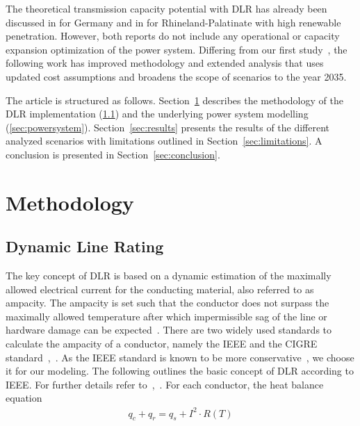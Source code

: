 \documentclass[preprint,12pt]{elsarticle}
\begin{document}
The theoretical transmission capacity potential with DLR has already been discussed in \cite{samweberProjektMeritOrder2016} for Germany and in \cite{energynauticsgmbhoko-insitute.v.bird&birdDistributionSystemStudy2016} for Rhineland-Palatinate with high renewable penetration. However, both reports do not include any operational or capacity expansion optimization of the power system.
Differing from our first study~\cite{glaumEnhancingGermanTransmission2022}, the following work has improved methodology and extended analysis that uses updated cost assumptions and broadens the scope of scenarios to the year 2035.

The article is structured as follows.
Section~\ref{sec:methodology} describes the methodology of the DLR implementation (\ref{sec:dlr}) and the underlying power system modelling (\ref{sec:powersystem}). Section~\ref{sec:results} presents the results of the different analyzed scenarios with  limitations outlined in Section~\ref{sec:limitations}. A conclusion is presented in Section~\ref{sec:conclusion}.


\section{Methodology}
\label{sec:methodology}

\subsection{Dynamic Line Rating}
\label{sec:dlr}

The key concept of DLR is based on a dynamic estimation of the maximally allowed electrical current for the conducting material, also referred to as ampacity.
The ampacity is set such that the conductor does not surpass the maximally allowed temperature  after which impermissible sag of the line or hardware damage can be expected~\cite{KARIMI2018600}.
There are two widely used standards to calculate the ampacity of a conductor, namely the IEEE and the CIGRE standard~\cite{ieeeIEEEStd738},~\cite{iglesiasGUIDETHERMALRATING2014}. As the IEEE standard is known to be  more conservative~\cite{simmsComparativeAnalysisDynamic2013}, we choose it for our modeling.
The following outlines the basic concept of DLR according to IEEE. For further details refer to~\cite{ieeeIEEEStandardCalculating2012},~\cite{ieeeIEEEStd738}.
For each conductor, the heat balance equation
\begin{align}
    q_c +q_r = q_s + I^2 \cdot R(T)
    \label{eq:heat_balance}
\end{align}
\end{document}
